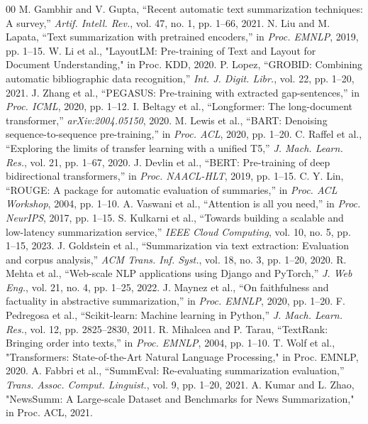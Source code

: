 \documentclass[conference]{IEEEtran}
\begin{document}
\begin{itemize}
\begin{thebibliography}{00}
 M. Gambhir and V. Gupta, ``Recent automatic text summarization techniques: A survey,'' \textit{Artif. Intell. Rev.}, vol. 47, no. 1, pp. 1--66, 2021.
 N. Liu and M. Lapata, ``Text summarization with pretrained encoders,'' in \textit{Proc. EMNLP}, 2019, pp. 1--15.
 W. Li et al., "LayoutLM: Pre-training of Text and Layout for Document Understanding," in Proc. KDD, 2020.
 P. Lopez, ``GROBID: Combining automatic bibliographic data recognition,'' \textit{Int. J. Digit. Libr.}, vol. 22, pp. 1--20, 2021.
 J. Zhang et al., ``PEGASUS: Pre-training with extracted gap-sentences,'' in \textit{Proc. ICML}, 2020, pp. 1--12.
 I. Beltagy et al., ``Longformer: The long-document transformer,'' \textit{arXiv:2004.05150}, 2020.
 M. Lewis et al., ``BART: Denoising sequence-to-sequence pre-training,'' in \textit{Proc. ACL}, 2020, pp. 1--20.
 C. Raffel et al., ``Exploring the limits of transfer learning with a unified T5,'' \textit{J. Mach. Learn. Res.}, vol. 21, pp. 1--67, 2020.
 J. Devlin et al., ``BERT: Pre-training of deep bidirectional transformers,'' in \textit{Proc. NAACL-HLT}, 2019, pp. 1--15.
 C. Y. Lin, ``ROUGE: A package for automatic evaluation of summaries,'' in \textit{Proc. ACL Workshop}, 2004, pp. 1--10.
 A. Vaswani et al., ``Attention is all you need,'' in \textit{Proc. NeurIPS}, 2017, pp. 1--15.
 S. Kulkarni et al., ``Towards building a scalable and low-latency summarization service,'' \textit{IEEE Cloud Computing}, vol. 10, no. 5, pp. 1--15, 2023.
 J. Goldstein et al., ``Summarization via text extraction: Evaluation and corpus analysis,'' \textit{ACM Trans. Inf. Syst.}, vol. 18, no. 3, pp. 1--20, 2020.
 R. Mehta et al., ``Web-scale NLP applications using Django and PyTorch,'' \textit{J. Web Eng.}, vol. 21, no. 4, pp. 1--25, 2022.
 J. Maynez et al., ``On faithfulness and factuality in abstractive summarization,'' in \textit{Proc. EMNLP}, 2020, pp. 1--20.
 F. Pedregosa et al., ``Scikit-learn: Machine learning in Python,'' \textit{J. Mach. Learn. Res.}, vol. 12, pp. 2825--2830, 2011.
 R. Mihalcea and P. Tarau, ``TextRank: Bringing order into texts,'' in \textit{Proc. EMNLP}, 2004, pp. 1--10.
 T. Wolf et al., "Transformers: State-of-the-Art Natural Language Processing," in Proc. EMNLP, 2020.
 A. Fabbri et al., ``SummEval: Re-evaluating summarization evaluation,'' \textit{Trans. Assoc. Comput. Linguist.}, vol. 9, pp. 1--20, 2021.
 A. Kumar and L. Zhao, "NewsSumm: A Large-scale Dataset and Benchmarks for News Summarization," in Proc. ACL, 2021.

\end{thebibliography}
\end{itemize}
\end{document}
